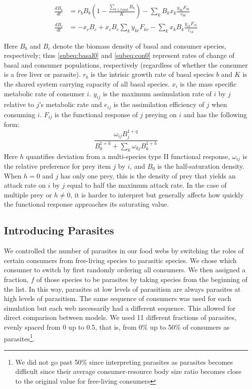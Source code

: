 \documentclass[11pt]{amsart}
\begin{document}
\begin{subequations}\label{eq:atn0}
\begin{align}
\frac{dB_{b}}{dt} &= r_bB_b\left(1-\frac{\sum_{k\in\text{basal}}B_k}{K}\right) - \sum_kB_kx_k\frac{y_{bk}F_{bk}}{e_{bk}}\label{subeq:basal0} \\ 
\frac{dB_{c}}{dt} &= -x_cB_c + x_cB_c\sum_ky_{kc}F_{kc} - \sum_k x_kB_k\frac{y_{ck}F_{ck}}{e_{ck}} \label{subeq:con0}
\end{align}
\end{subequations}

Here $B_b$ and $B_c$ denote the biomass density of basal and consumer species, respectively; thus \eqref{subeq:basal0} and \eqref{subeq:con0} represent rates of change of basal and consumer populations, respectively (regardless of whether the consumer is a free liver or parasite).  $r_b$ is the intrisic growth rate of basal species $b$ and $K$ is the shared system carrying capacity of all basal species.  $x_i$ is the mass specific metabolic rate of consumer $i$. $y_{ij}$ is the maximum assimulation rate of $i$ by $j$ relative to $j$'s metabolic rate and $e_{ij}$ is the assimilation efficiency of $j$ when consuming $i$. $F_{ij}$ is the functional response of $j$ preying on $i$ and has the following form:
\begin{equation}
\frac{\omega_{ij}B_j^{1+q}}{B_0^{1+h} + \sum_k\omega_{kj}B_k^{1+h}}\label{eq:fr0}
\end{equation}
Here $h$ quantifies deviation from a multi-species type II functional response, $\omega_{ij}$ is the relative preference for prey item $j$ by $i$, and $B_0$ is the half-saturation density.  When $h=0$ and $j$ has only one prey, this is the density of prey that yields an attack rate on $i$ by $j$ equal to half the maximum attack rate.  In the case of multiple prey or $h\neq0$, it is harder to interpret but generally affects how quickly the functional response approaches its saturating value.  

\subsection{Introducing Parasites\label{subsec:paraIntro}}

We controlled the number of parasites in our food webs by switching the roles of certain consumers from free-living species to parasitic species.  We chose which consumer to switch by first randomly ordering all consumers.  We then assigned a fraction, $f$ of those species to be parasites by taking species from the beginning of the list.  In this way, parasites at low levels of parasitism are always parasites at high levels of parasitism.  The same sequence of consumers was used for each simulation but each web necessarily had a different sequence.  This allowed for direct comparison between models.  We used 11 different fractions of parasites, evenly spaced from 0 up to 0.5, that is, from 0\% up to 50\% of consumers as parasites\footnote{We did not go past 50\% since interpreting parasites as parasites becomes difficult since their average consumer-resource body size ratio becomes close to the original value for free-living consumers}.
\end{document}
